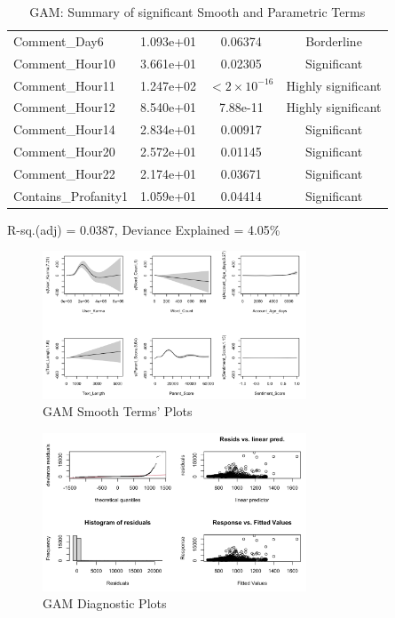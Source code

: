 \documentclass[10pt]{article}
\begin{document}
\begin{table}[H]
\begin{tabular}{lccc}
Comment\_Day6                   & 1.093e+01  & 0.06374 & Borderline \\
Comment\_Hour10                 & 3.661e+01  & 0.02305 & Significant \\
Comment\_Hour11                 & 1.247e+02  & $<2\times10^{-16}$ & Highly significant \\
Comment\_Hour12                 & 8.540e+01  & 7.88e-11 & Highly significant \\
Comment\_Hour14                 & 2.834e+01  & 0.00917 & Significant \\
Comment\_Hour20                 & 2.572e+01  & 0.01145 & Significant \\
Comment\_Hour22                 & 2.174e+01  & 0.03671 & Significant \\
Contains\_Profanity1            & 1.059e+01  & 0.04414 & Significant \\
\bottomrule
\end{tabular}

\bigskip
\noindent R-sq.(adj) = 0.0387, Deviance Explained = 4.05\%\\
\caption{GAM: Summary of significant Smooth and Parametric Terms}
\label{tab:gam_results}
\end{table}


\begin{figure}[H]
    \centering
    \includegraphics[width=0.7\textwidth]{pictures/gam_plot_1.png}
    \caption{GAM Smooth Terms' Plots}
    \label{fig:gam_smooth_plots}
\end{figure}

\begin{figure}[H]
    \centering
    \includegraphics[width=0.7\textwidth]{pictures/gam_plot_2.png}
    \caption{GAM Diagnostic Plots}
    \label{fig:gam_diag_plots}
\end{figure}
\end{document}
